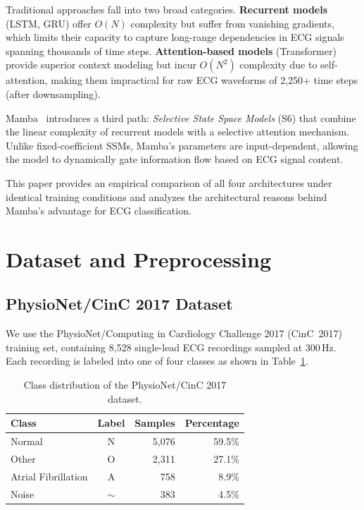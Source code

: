 \documentclass[runningheads]{llncs}
\begin{document}
Traditional approaches fall into two broad categories. \textbf{Recurrent
models} (LSTM, GRU) offer $O(N)$ complexity but suffer from vanishing
gradients, which limits their capacity to capture long-range dependencies in
ECG signals spanning thousands of time steps. \textbf{Attention-based models}
(Transformer) provide superior context modeling but incur $O(N^2)$ complexity
due to self-attention, making them impractical for raw ECG waveforms of
2,250+ time steps (after downsampling).

Mamba~\cite{gu2023mamba} introduces a third path: \textit{Selective State
Space Models} (S6) that combine the linear complexity of recurrent models with
a selective attention mechanism. Unlike fixed-coefficient SSMs, Mamba's
parameters are input-dependent, allowing the model to dynamically gate
information flow based on ECG signal content.

This paper provides an empirical comparison of all four architectures under
identical training conditions and analyzes the architectural reasons behind
Mamba's advantage for ECG classification.


\section{Dataset and Preprocessing}
\label{sec:dataset}

\subsection{PhysioNet/CinC 2017 Dataset}

We use the PhysioNet/Computing in Cardiology Challenge 2017
(CinC~2017)~\cite{clifford2017af} training set, containing 8,528 single-lead
ECG recordings sampled at 300\,Hz. Each recording is labeled into one of four
classes as shown in Table~\ref{tab:class_dist}.

\begin{table}[ht]
\centering
\caption{Class distribution of the PhysioNet/CinC 2017 dataset.}
\label{tab:class_dist}
\begin{tabular}{@{} l c r r @{}}
\toprule
\textbf{Class} & \textbf{Label} & \textbf{Samples} & \textbf{Percentage} \\
\midrule
Normal              & N    & 5,076 & 59.5\% \\
Other               & O    & 2,311 & 27.1\% \\
Atrial Fibrillation & A    &   758 &  8.9\% \\
Noise               & $\sim$ & 383 &  4.5\% \\
\bottomrule
\end{tabular}
\end{table}
\end{document}
